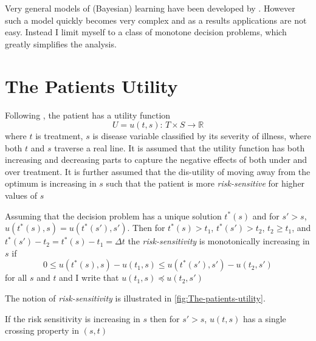 \documentclass[10pt,a4paper]{article} 					%
\begin{document}
Very general models of (Bayesian) learning have been developed by \textcite{Grossman1977}. However such a model quickly becomes very complex and as a results applications are not easy. Instead I limit myself to a class of monotone decision problems, which greatly simplifies the analysis.

\section{The Patients Utility}

Following \citet{Rochaix1989}, the patient has a utility function
\[
	U = u(t,s):\, T\times S\rightarrow\mathbb{R}
\]
where \(t\) is treatment, \(s\) is disease variable classified by its severity of illness, where both \(t\) and \(s\) traverse a real line. It is assumed that the utility function has both increasing and decreasing parts to capture the negative effects of both under and over treatment. It is further assumed that the dis-utility of moving away from the optimum is increasing in \(s\)  such that the patient is more \emph{risk-sensitive} for higher values of \(s\)

\begin{defn}\label{def:risk-sensitivity}
Assuming that the decision problem has a unique solution \(t^{*}(s)\)  and for \(s'>s\),  \(u(t^{*}(s),s)=u(t^{*}(s'),s')\). Then for \(t^{*}(s)>t_{1}\), \(t^{*}(s')>t_{2}\),  \(t_{2}\ge t_{1}\), and \(t^{*}(s')-t_{2}=t^{*}(s)-t_{1}=\Delta t\) the \emph{risk-sensitivity} is monotonically increasing in \(s\)  if
\[
	0\le u(t^{*}(s),s)-u(t_{1},s)\le u(t^{*}(s'),s')-u(t_{2},s')\label{eq:risk-sensitivity}
\]
for all \(s\) and \(t\)  and I write that \(u(t_{1},s)\preceq u(t_{2},s')\)
\end{defn}

The notion of \emph{risk-sensitivity} is illustrated in \cref{fig:The-patients-utility}.

\begin{thm}\label{thm:single-crossing}
If the risk sensitivity is increasing in \(s\)  then for \(s'>s\), \(u(t,s)\) has a single crossing property in \((s,t)\)
\end{thm}
\end{document}
